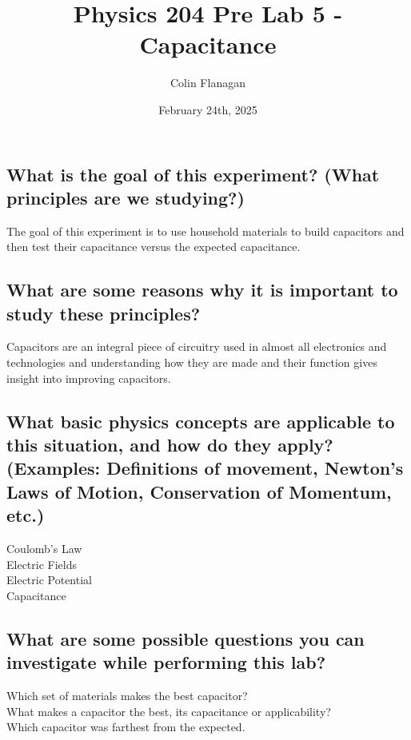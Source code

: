 \documentclass{article}
\title{Physics 204 Pre Lab 5 - Capacitance}
\author{Colin Flanagan}
\date{February 24th, 2025}
\begin{document}
\maketitle

\subsection*{What is the goal of this experiment? (What principles are we studying?)}

    The goal of this experiment is to use household materials to build capacitors and then test their capacitance versus the expected capacitance. 

\subsection*{What are some reasons why it is important to study these principles?
}

  Capacitors are an integral piece of circuitry used in almost all electronics and technologies and understanding how they are made and their function gives insight into improving capacitors.
    
\subsection*{What basic physics concepts are applicable to this situation, and how do they apply? (Examples: Definitions of movement, Newton’s Laws of Motion, Conservation of Momentum, etc.)}

    Coulomb's Law\\

    Electric Fields\\

    Electric Potential\\

    Capacitance
\subsection*{What are some possible questions you can investigate while performing this lab?
}

   Which set of materials makes the best capacitor?\\

   What makes a capacitor the best, its capacitance or applicability?\\

   Which capacitor was farthest from the expected.
\end{document}
